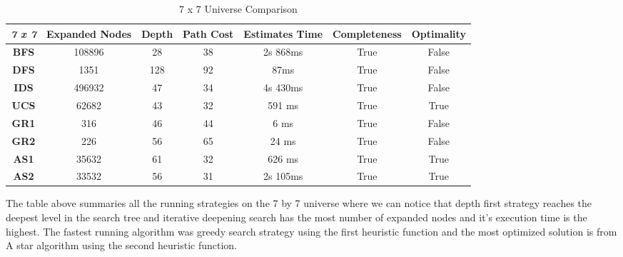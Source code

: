\documentclass{article}
\begin{document}
\begin{table}[!hpt]
  \centering
  \begin{tabular}{|c|c|c|c|c|c|c|}
  \hline
  \cellcolor[HTML]{9B9B9B}\textit{\textbf{7 x 7}} & \textbf{Expanded Nodes} & \textbf{Depth} & \textbf{Path Cost} & \textbf{Estimates Time} & \textbf{Completeness} & \textbf{Optimality} \\ \hline
  \textbf{BFS}                                    & 108896                  & 28             & 38                 & 2s 868ms     & True & False           \\ \hline
  \textbf{DFS}                                    & 1351                    & \cellcolor[HTML]{ffcccb}128            & 92                 & 87ms         & True & False           \\ \hline
  \textbf{IDS}                                    & \cellcolor[HTML]{ffcccb}496932                  & 47             & 34                 & 4s 430ms     & True & False           \\ \hline
  \textbf{UCS}                                    & 62682                   & 43             & 32                 & 591 ms       & True & True           \\ \hline
  \textbf{GR1}                                    & 316                     & 46             & 44                 & \cellcolor[HTML]{90ee90}6 ms         & True & False           \\ \hline
  \textbf{GR2}                                    & 226                     & 56             & 65                 & 24 ms        & True & False           \\ \hline
  \textbf{AS1}                                    & 35632                   & 61             & 32                 & 626 ms       & True & True           \\ \hline
  \textbf{AS2}                                    & 33532                   & 56             & 31                 & 2s 105ms     & True & True           \\ \hline
  \end{tabular}
  \caption{7 x 7 Universe Comparison}
  \label{tab:7by7}
  \end{table}

The table above summaries all the running strategies on the 7 by 7 universe where we can notice that depth first strategy reaches the deepest level in the search tree and iterative deepening search has the most number of expanded nodes and it's execution time is the highest. The fastest running algorithm was greedy search strategy using the first heuristic function and the most optimized solution is from A star algorithm using the second heuristic function.
\end{document}
